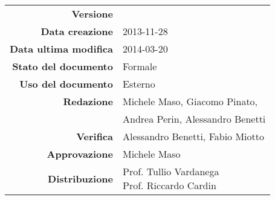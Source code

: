 

\newcommand{\Versione}{\versioneGlossario{}}
\newcommand{\Data}{2013-11-28}
\newcommand{\DataUltimaModifica}{2014-03-20}
\newcommand{\TipoDocumento}{Glossario}
\newcommand{\Lettera}[1]{\huge #1}
\newcommand{\Riga}{\\\rule[2mm]{\textwidth}{0.25mm}}
\newcommand{\Termine}{\emph}
\newcommand{\Inizio}{}

\newcommand{\paginaGlossario}[1]{
\newpage
\setcounter{secnumdepth}{0} %
\section{\Lettera{#1}}
}

\newcommand{\elemento}[2]{
\setcounter{secnumdepth}{0} %
\subsection{#1}
\begin{quote}
{#2}
\end{quote}
}



\begin{center}

\begin{tabular}{r|l}
\textbf{Versione} & \Versione\\
\textbf{Data creazione} & \Data \\
\textbf{Data ultima modifica} & \DataUltimaModifica \\
\textbf{Stato del documento} & Formale \\
\textbf{Uso del documento} & Esterno \\
\textbf{Redazione} & Michele Maso, Giacomo Pinato,\\
                   & Andrea Perin, Alessandro Benetti\\
\textbf{Verifica} & Alessandro Benetti, Fabio Miotto \\
\textbf{Approvazione} & Michele Maso \\
\textbf{Distribuzione} & \parbox[t]{4cm}{Prof. Tullio Vardanega \\ Prof. Riccardo Cardin \\ \Prop{} } \\
\end{tabular}
\end{center}
\vspace{.01in}


